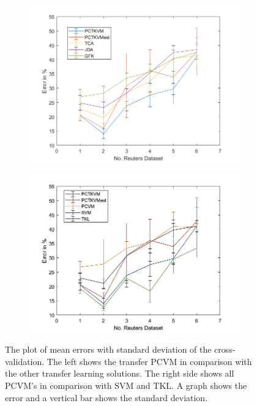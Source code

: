 \begin{figure}[!]
	\centering
	\begin{subfigure}{.5\textwidth}
		\centering
		\includegraphics[width=1\linewidth]{figures/FiveTwoReutersTL.png}
		\caption{\label{FigErrorReuTL}}
	\end{subfigure}%
	\begin{subfigure}{.5\textwidth}
		\centering
		\includegraphics[width=1\linewidth]{figures/PerformanceReuters.png}
		\caption{\label{FigErrorReuO}}
	\end{subfigure}
	\caption[Plot of Mean Error and Standard Deviation on Reuters Dataset (CV)]{The plot of mean errors with standard deviation of the cross-validation. The left shows the transfer \acs{PCVM} in comparison with the other transfer learning solutions. The right side shows all \acs{PCVM}'s in comparison with \acs{SVM} and \acs{TKL}. A graph shows the error and a vertical bar shows the standard deviation. \label{FigErrorReutersDatasetsB}}
\end{figure}

